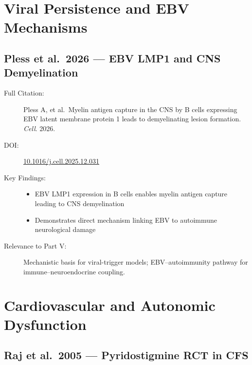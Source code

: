 \section{Viral Persistence and EBV Mechanisms}
\label{sec:bib-viral-additions}

\subsection{Pless et al.\ 2026 --- EBV LMP1 and CNS Demyelination}

\begin{description}
    \item[Full Citation:] Pless A, et al.\ Myelin antigen capture in the CNS by B cells expressing EBV latent membrane protein 1 leads to demyelinating lesion formation. \textit{Cell}. 2026. \cite{Pless2026ebv_demyelination}
    \item[DOI:] \href{https://doi.org/10.1016/j.cell.2025.12.031}{10.1016/j.cell.2025.12.031}
    \item[Key Findings:]
    \begin{itemize}
        \item EBV LMP1 expression in B cells enables myelin antigen capture leading to CNS demyelination
        \item Demonstrates direct mechanism linking EBV to autoimmune neurological damage
    \end{itemize}
    \item[Relevance to Part V:] Mechanistic basis for viral-trigger models; EBV--autoimmunity pathway for immune--neuroendocrine coupling.
\end{description}

\section{Cardiovascular and Autonomic Dysfunction}
\label{sec:bib-cardiovascular-additions}

\subsection{Raj et al.\ 2005 --- Pyridostigmine RCT in CFS}

